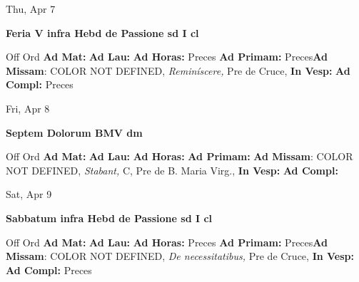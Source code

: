 \documentclass[10pt]{memoir}
\begin{document}
\begin{center}
\begin{minipage}{3.5in}
\vspace{2em}
\begin{center}Thu, Apr 7
\end{center}
\textbf{ \large Feria V infra Hebd de Passione
\textnormal{\normalsize sd I cl}}

\begin{justify}Off Ord
\textbf{Ad Mat: }
\textbf{Ad Lau: }
\textbf{Ad Horas: }Preces
\textbf{Ad Primam: }Preces\textbf{Ad Missam}: COLOR NOT DEFINED, \textit{Reminíscere,} Pre de Cruce, 
\textbf{In Vesp: }
\textbf{Ad Compl: }Preces
\end{justify}
\end{minipage}
\end{center}

\begin{center}
\begin{minipage}{3.5in}
\vspace{2em}
\begin{center}Fri, Apr 8
\end{center}
\textbf{ \large Septem Dolorum BMV
\textnormal{\normalsize dm}}

\begin{justify}Off Ord
\textbf{Ad Mat: }
\textbf{Ad Lau: }
\textbf{Ad Horas: }
\textbf{Ad Primam: }\textbf{Ad Missam}: COLOR NOT DEFINED, \textit{Stabant,} C, Pre de B. Maria Virg., 
\textbf{In Vesp: }
\textbf{Ad Compl: }
\end{justify}
\end{minipage}
\end{center}

\begin{center}
\begin{minipage}{3.5in}
\vspace{2em}
\begin{center}Sat, Apr 9
\end{center}
\textbf{ \large Sabbatum infra Hebd de Passione
\textnormal{\normalsize sd I cl}}

\begin{justify}Off Ord
\textbf{Ad Mat: }
\textbf{Ad Lau: }
\textbf{Ad Horas: }Preces
\textbf{Ad Primam: }Preces\textbf{Ad Missam}: COLOR NOT DEFINED, \textit{De necessitatibus,} Pre de Cruce, 
\textbf{In Vesp: }
\textbf{Ad Compl: }Preces
\end{justify}
\end{minipage}
\end{center}
\end{document}
